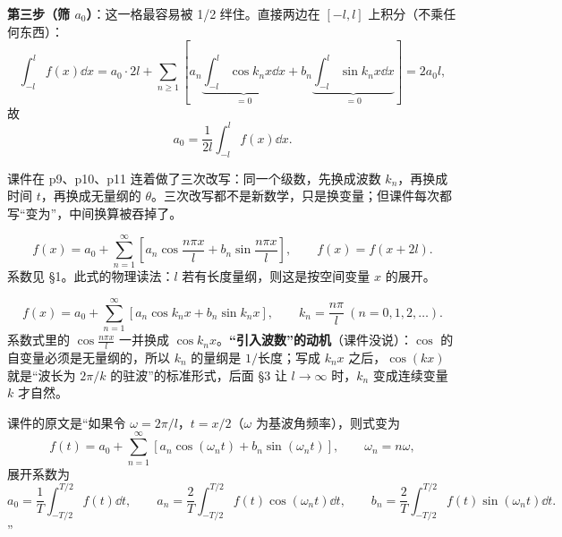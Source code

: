 \documentclass[11pt]{ctexart}
\begin{document}
\textbf{第三步（筛 $a_0$）}：这一格最容易被 1/2 绊住。直接两边在 $[-l,l]$ 上积分（不乘任何东西）：
\[
\int_{-l}^{l}f(x)\dd x=a_0\cdot 2l+\sum_{n\ge1}\left[a_n\underbrace{\int_{-l}^{l}\cos k_nx\dd x}_{=0}+b_n\underbrace{\int_{-l}^{l}\sin k_nx\dd x}_{=0}\right]=2a_0l ,
\]
故
\[ a_0=\frac{1}{2l}\int_{-l}^{l}f(x)\dd x .\]




课件在 p9、p10、p11 连着做了三次改写：同一个级数，先换成波数 $k_n$，再换成时间 $t$，再换成无量纲的 $\theta$。三次改写都不是新数学，只是换变量；但课件每次都写“变为”，中间换算被吞掉了。


\[ f(x)=a_0+\sum_{n=1}^{\infty}\left[a_n\cos\frac{n\pi x}{l}+b_n\sin\frac{n\pi x}{l}\right],\qquad f(x)=f(x+2l) .\]
系数见 §1。此式的物理读法：$l$ 若有长度量纲，则这是按空间变量 $x$ 的展开。


\[ f(x)=a_0+\sum_{n=1}^{\infty}\left[a_n\cos k_nx+b_n\sin k_nx\right],\qquad k_n=\frac{n\pi}{l}\ (n=0,1,2,\dots) .\]
系数式里的 $\cos\frac{n\pi x}{l}$ 一并换成 $\cos k_nx$。\textbf{“引入波数”的动机}（课件没说）：$\cos$ 的自变量必须是无量纲的，所以 $k_n$ 的量纲是 $1/$长度；写成 $k_nx$ 之后，$\cos(kx)$ 就是“波长为 $2\pi/k$ 的驻波”的标准形式，后面 §3 让 $l\to\infty$ 时，$k_n$ 变成连续变量 $k$ 才自然。


课件的原文是“如果令 $\omega=2\pi/l$，$t=x/2$（$\omega$ 为基波角频率），则式变为
\[ f(t)=a_0+\sum_{n=1}^{\infty}\left[a_n\cos(\omega_nt)+b_n\sin(\omega_nt)\right],\qquad \omega_n=n\omega ,\]
展开系数为
\[ a_0=\frac{1}{T}\int_{-T/2}^{T/2}f(t)\dd t,\qquad
a_n=\frac{2}{T}\int_{-T/2}^{T/2}f(t)\cos(\omega_nt)\dd t,\qquad
b_n=\frac{2}{T}\int_{-T/2}^{T/2}f(t)\sin(\omega_nt)\dd t .\]”
\end{document}
